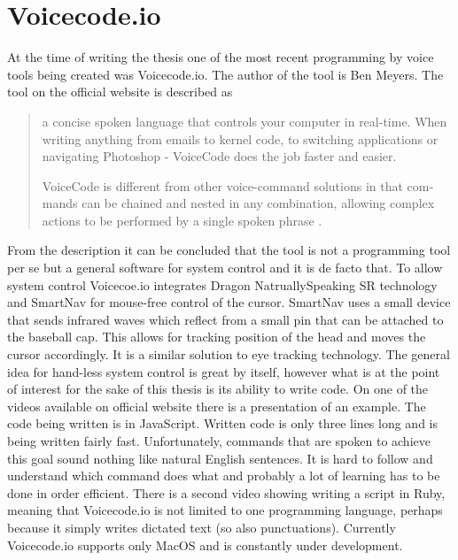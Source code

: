 \section{Voicecode.io}
At the time of writing the thesis one of the most recent programming by voice tools being created was Voicecode.io. The author of the tool is Ben Meyers. The tool on the official website is described as 
\begin{quote}
    \begin{english}
    a concise spoken language that controls your computer in real-time. When writing anything from emails to kernel code, to switching applications or navigating Photoshop - VoiceCode does the job faster and easier. 
    
    VoiceCode is different from other voice-command solutions in that commands can be chained and nested in any combination, allowing complex actions to be performed by a single spoken phrase \cite{Voicecode.io2017}.
    \end{english}
 \end{quote}
From the description it can be concluded that the tool is not a programming tool per se but a general software for system control and it is de facto that. To allow system control Voicecoe.io integrates Dragon NatruallySpeaking SR technology and SmartNav for mouse-free control of the cursor. SmartNav uses a small device that sends infrared waves which reflect from a small pin that can be attached to the baseball cap. This allows for tracking position of the head and moves the cursor accordingly. It is a similar solution to eye tracking technology. The general idea for hand-less system control is great by itself, however what is at the point of interest for the sake of this thesis is its ability to write code. On one of the videos available on official website there is a presentation of an example. The code being written is in JavaScript. Written code is only three lines long and is being written fairly fast. Unfortunately, commands that are spoken to achieve this goal sound nothing like natural English sentences. It is hard to follow and understand which command does what and probably a lot of learning has to be done in order efficient. There is a second video showing writing a script in Ruby, meaning that Voicecode.io is not limited to one programming language, perhaps because it simply writes dictated text (so also punctuations). Currently Voicecode.io supports only MacOS and is constantly under development.

